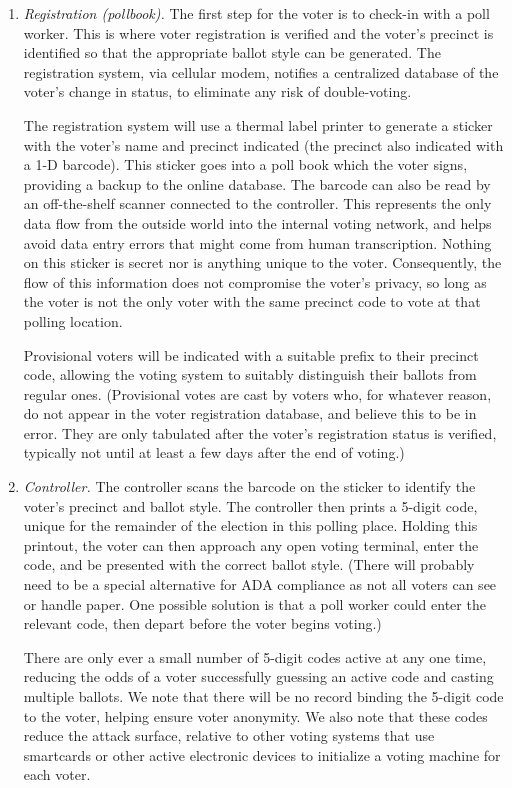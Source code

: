 \begin{enumerate}
\item {\em Registration (pollbook).}
The first step for the voter is to check-in with a poll worker. This
is where voter registration is verified and the voter's precinct is
identified so that the appropriate ballot style can be generated. 
The registration system, via cellular modem, notifies a centralized
database of the voter's change in status, to eliminate any risk of
double-voting.

The registration system will
use a thermal label printer to generate a sticker with the
voter's name and precinct indicated (the precinct also indicated with
a 1-D barcode). This sticker goes into a poll book which
the voter signs, providing a backup to the online database.
The barcode can also be read by an off-the-shelf scanner connected to
the controller. This represents the only data flow from the outside
world into the internal voting network, and helps avoid data
entry errors that might come from human transcription. 
Nothing on this sticker is secret nor is anything unique to the
voter. 
Consequently, the flow of this information does not compromise
the voter's privacy, so long as the voter is not the only voter
with the same precinct code to vote at that polling location.

Provisional voters will be indicated with a suitable prefix to their
precinct code, allowing the voting system to suitably distinguish
their ballots from regular ones. (Provisional votes are cast by voters
who, for whatever reason, do not appear in the voter registration
database, and believe this to be in error. They are only tabulated
after the voter's registration status is verified, typically not until
at least a few days after the end of voting.)

\item {\em Controller.}
The controller scans the barcode on the sticker to identify 
the voter's precinct and ballot style. 
The controller then prints a 5-digit code,
unique for the remainder of the election in this polling
place. Holding this printout, the voter can then approach any open
voting terminal, enter the code, and be presented with the correct
ballot style. 
(There will probably need to be a special alternative for ADA
compliance as not all voters can see or handle paper. One possible
solution is that a poll worker could enter the relevant code, then
depart before the voter begins voting.)

There are only ever a small number of 5-digit codes active at any one
time, reducing the odds of a voter successfully guessing an active
code and casting multiple ballots.
We note that there will be no record binding the 5-digit code to the
voter, helping ensure voter anonymity. We also note that these codes
reduce the attack surface, relative to other voting systems that use
smartcards or other active electronic devices to initialize a voting
machine for each voter.


\end{enumerate}
